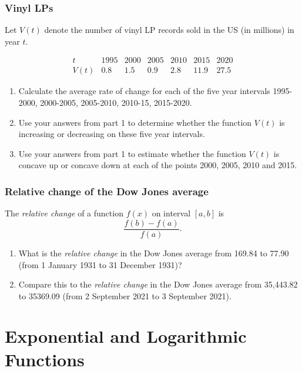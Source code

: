 \documentclass[
]{book}
\providecommand{\tightlist}{%
  \setlength{\itemsep}{0pt}\setlength{\parskip}{0pt}}
\begin{document}
\hypertarget{vinyl-lps}{%
\subsection{Vinyl LPs}\label{vinyl-lps}}

Let \(V(t)\) denote the number of vinyl LP records sold in the US (in millions) in year \(t\).

\[
\begin{array}{c|c|c|c|c|c|c}
t & 1995 & 2000 & 2005 & 2010 & 2015 & 2020 \\
\hline
V(t) & 0.8 & 1.5 & 0.9 & 2.8 & 11.9 & 27.5
\end{array}
\]

\begin{enumerate}
\def\labelenumi{\arabic{enumi}.}
\tightlist
\item
  Calculate the average rate of change for each of the five year intervals 1995-2000, 2000-2005, 2005-2010, 2010-15, 2015-2020.
\item
  Use your answers from part 1 to determine whether the function \(V(t)\) is increasing or decreasing on these five year intervals.
\item
  Use your answers from part 1 to estimate whether the function \(V(t)\) is concave up or concave down at each of the points 2000, 2005, 2010 and 2015.
\end{enumerate}

\hypertarget{relative-change-of-the-dow-jones-average-1}{%
\subsection{Relative change of the Dow Jones average}\label{relative-change-of-the-dow-jones-average-1}}

The \emph{relative change} of a function \(f(x)\) on interval \([a,b]\) is
\[ \frac{f(b)-f(a)}{f(a)}.\]

\begin{enumerate}
\def\labelenumi{\arabic{enumi}.}
\tightlist
\item
  What is the \emph{relative change} in the Dow Jones average from 169.84 to 77.90 (from 1 January 1931 to 31 December 1931)?
\item
  Compare this to the \emph{relative change} in the Dow Jones average from 35,443.82 to 35369.09 (from 2 September 2021 to 3 September 2021).
\end{enumerate}

\hypertarget{exponential-and-logarithmic-functions}{%
\chapter{Exponential and Logarithmic Functions}\label{exponential-and-logarithmic-functions}}
\end{document}
